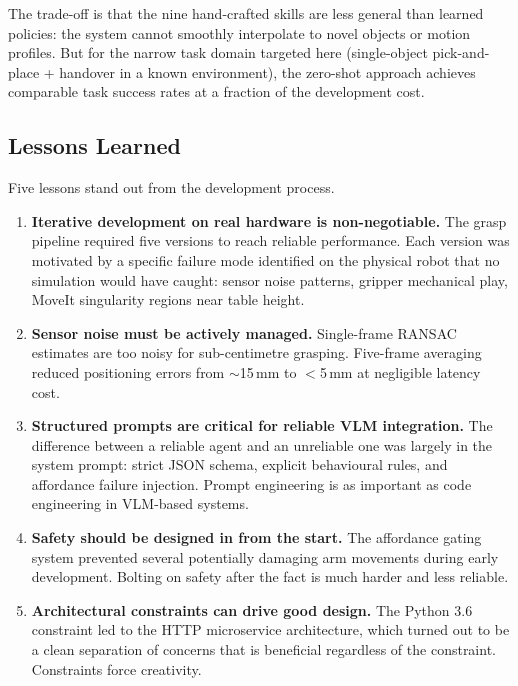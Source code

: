 The trade-off is that the nine hand-crafted skills are less general than learned
policies: the system cannot smoothly interpolate to novel objects or motion profiles.
But for the narrow task domain targeted here (single-object pick-and-place + handover in
a known environment), the zero-shot approach achieves comparable task success rates at
a fraction of the development cost.

\subsection{Lessons Learned}

Five lessons stand out from the development process.

\begin{enumerate}

  \item \textbf{Iterative development on real hardware is non-negotiable.}
        The grasp pipeline required five versions to reach reliable performance.
        Each version was motivated by a specific failure mode identified on the physical
        robot that no simulation would have caught: sensor noise patterns, gripper
        mechanical play, MoveIt singularity regions near table height.

  \item \textbf{Sensor noise must be actively managed.}
        Single-frame RANSAC estimates are too noisy for sub-centimetre grasping.
        Five-frame averaging reduced positioning errors from $\sim$15\,mm to $<$5\,mm
        at negligible latency cost.

  \item \textbf{Structured prompts are critical for reliable VLM integration.}
        The difference between a reliable agent and an unreliable one was largely in the
        system prompt: strict JSON schema, explicit behavioural rules, and affordance
        failure injection.
        Prompt engineering is as important as code engineering in VLM-based systems.

  \item \textbf{Safety should be designed in from the start.}
        The affordance gating system prevented several potentially damaging arm movements
        during early development.
        Bolting on safety after the fact is much harder and less reliable.

  \item \textbf{Architectural constraints can drive good design.}
        The Python 3.6 constraint led to the HTTP microservice architecture, which turned
        out to be a clean separation of concerns that is beneficial regardless of the
        constraint.
        Constraints force creativity.

\end{enumerate}

